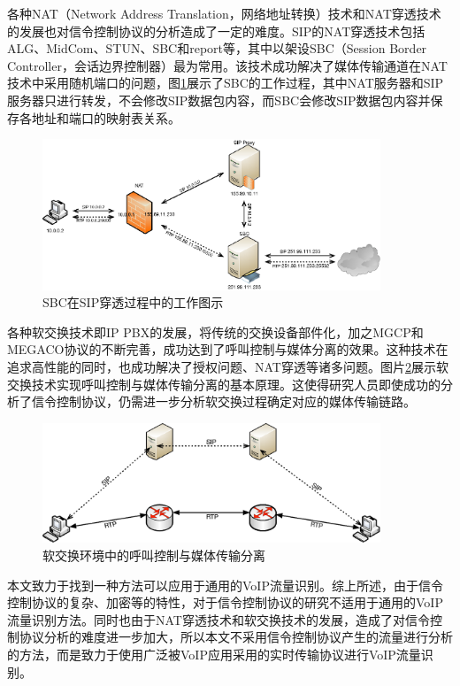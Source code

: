 各种NAT（Network Address Translation，网络地址转换）技术和NAT穿透技术的发展也对信令控制协议的分析造成了一定的难度。SIP的NAT穿透技术包括ALG、MidCom、STUN、SBC和report等，其中以架设SBC（Session Border Controller，会话边界控制器）最为常用。该技术成功解决了媒体传输通道在NAT技术中采用随机端口的问题，图\ref{fig:sbc}展示了SBC的工作过程，其中NAT服务器和SIP服务器只进行转发，不会修改SIP数据包内容，而SBC会修改SIP数据包内容并保存各地址和端口的映射表关系。

\begin{figure}[thb]
\begin{center}
\includegraphics[width=0.9\textwidth]{figures/sbc.eps}
\caption{SBC在SIP穿透过程中的工作图示}\label{fig:sbc}
\end{center}
\end{figure}

各种软交换技术即IP PBX的发展，将传统的交换设备部件化，加之MGCP和MEGACO协议的不断完善，成功达到了呼叫控制与媒体分离的效果。这种技术在追求高性能的同时，也成功解决了授权问题、NAT穿透等诸多问题。图片\ref{fig:softswitch}展示软交换技术实现呼叫控制与媒体传输分离的基本原理。这使得研究人员即使成功的分析了信令控制协议，仍需进一步分析软交换过程确定对应的媒体传输链路。
\begin{figure}[thb]
\begin{center}
\includegraphics[width=0.9\textwidth]{figures/softswitch.eps}
\caption{软交换环境中的呼叫控制与媒体传输分离}\label{fig:softswitch}
\end{center}
\end{figure}

本文致力于找到一种方法可以应用于通用的VoIP流量识别。综上所述，由于信令控制协议的复杂、加密等的特性，对于信令控制协议的研究不适用于通用的VoIP流量识别方法。同时也由于NAT穿透技术和软交换技术的发展，造成了对信令控制协议分析的难度进一步加大，所以本文不采用信令控制协议产生的流量进行分析的方法，而是致力于使用广泛被VoIP应用采用的实时传输协议进行VoIP流量识别。

